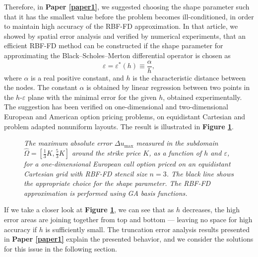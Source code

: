 \documentclass{UUThesisTemplate}
\begin{document}
\par
Therefore, in \textbf{Paper \ref{paper1}}, we suggested choosing the shape parameter such that it has the smallest value before the problem becomes ill-conditioned, in order to maintain high accuracy of the RBF-FD approximation. In that article, we showed by spatial error analysis and verified by numerical experiments, that an efficient RBF-FD method can be constructed if the shape parameter for approximating the Black--Scholes--Merton differential operator is chosen as 
\begin{equation}
\varepsilon=\varepsilon^*(h)\equiv\frac{\alpha}{h},
\label{eq:shape}
\end{equation}
where $\alpha$ is a real positive constant, and $h$ is the characteristic distance between the nodes. The constant $\alpha$ is obtained by linear regression between two points in the $h$-$\varepsilon$ plane with the minimal error for the given $h$, obtained experimentally. The suggestion has been verified on one-dimensional and two-dimensional European and American option pricing problems, on equidistant Cartesian and problem adapted nonuniform layouts. The result is illustrated in \textbf{Figure \ref{fig:contour1}}.
\begin{figure}[H]
\centering


\caption{\emph{The maximum absolute error $\Delta u_{\max}$ measured in the subdomain $\hat\Omega=[\frac{1}{3}K,\frac{5}{3}K]$ around the strike price $K$, as a function of $h$ and $\varepsilon$, for a one-dimensional European call option priced on an equidistant Cartesian grid with RBF-FD stencil size $n=3$. The black line shows the appropriate choice for the shape parameter. The RBF-FD approximation is performed using GA basis functions.}}
\label{fig:contour1}
\end{figure}
If we take a closer look at \textbf{Figure \ref{fig:contour1}}, we can see that as $h$ decreases, the high error areas are joining together from top and bottom --- leaving no space for high accuracy if $h$ is sufficiently small. The truncation error analysis results presented in \textbf{Paper \ref{paper1}} explain the presented behavior, and we consider the solutions for this issue in the following section. 
%





%





%
\end{document}
